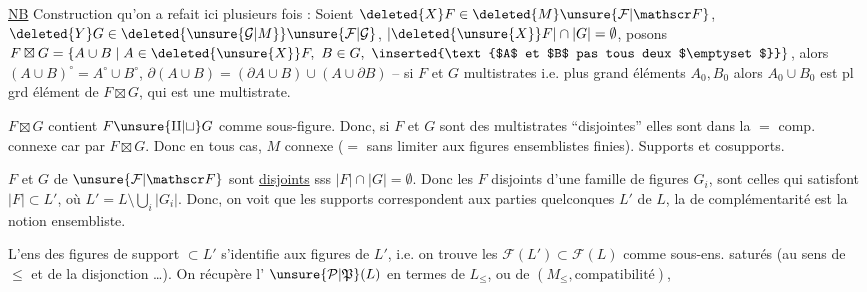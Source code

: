\uline{NB} Construction qu'on a refait ici plusieurs fois : Soient $\deleted{X}F\in\deleted{M}\unsure{\mathcal F|\mathscr F}$, $\deleted{Y}G\in\deleted{\unsure{\mathcal G|M}}\unsure{\mathcal F|\mathcal G}$, $\lvert\deleted{\unsure{X}}F\rvert\cap\lvert G\rvert=\emptyset$, posons $F\boxtimes G=\{A\cup B\mid A\in\deleted{\unsure{X}}F,\ B\in G,\ \inserted{\text{$A$ et $B$ pas tous deux $\emptyset$}}\}$, alors $(A\cup B)^{\circ}=A^{\circ}\cup B^{\circ}$, $\partial(A\cup B)=(\partial A\cup B)\cup(A\cup\partial B)$ -- si $F$ et $G$   multistrates i.e.   plus grand éléments  $A_0,B_0$ alors $A_0\cup B_0$ est pl grd élément de $F\boxtimes G$, qui est une multistrate.

 $F\boxtimes G$ contient $F\unsure{\amalg|\sqcup}G$ comme sous-figure. Donc, si $F$ et $G$ sont des multistrates ``disjointes'' elles sont dans la $=$ comp. connexe car  par $F\boxtimes G$. Donc en tous cas, \margin{)} $M$ connexe ($=$ sans  limiter aux  figures ensemblistes finies).
Supports et cosupports.

$F$ et $G$ de $\unsure{\mathcal F|\mathscr F}$ sont \uline{disjoints}  sss $\lvert F\rvert\cap\lvert G\rvert=\emptyset$. Donc les $F$ disjoints d'une famille de figures $G_i$, sont celles qui  satisfont $\lvert F\rvert\subset L'$, où $L'=L\setminus\bigcup_i\lvert G_i\rvert$. Donc, on voit que les supports correspondent aux parties quelconques $L'$ de $L$, la  de complémentarité est la notion ensembliste.

 L'ens des figures  de support $\subset L'$  s'identifie aux figures de $L'$, i.e. on trouve les $\mathcal F(L')\subset\mathcal F(L)$ comme sous-ens. saturés (au sens de $\leq$ et de la disjonction \ldots).
On récupère l' $\unsure{\mathcal P|\mathfrak P}(L)$ en termes de $L_{\leq}$, ou de $(M_{\leq},\text{compatibilité})$,


